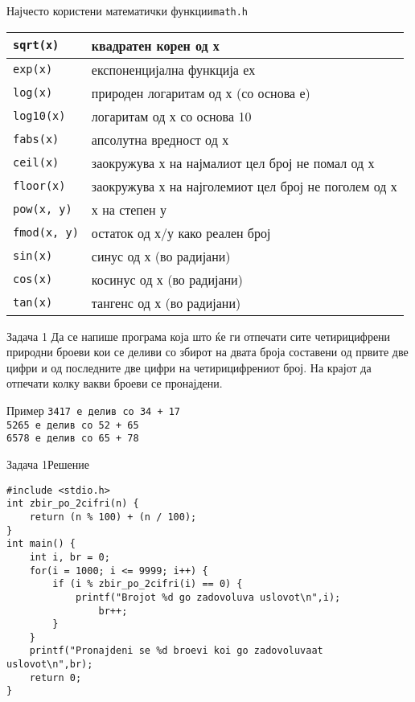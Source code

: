 \begin{frame}{Најчесто користени математички функции}{\texttt{math.h}}
\begin{tabular}{l | l}
\texttt{sqrt(x)} &  квадратен корен од х\\
\hline
\texttt{exp(x)} & експоненцијална функција  ех\\
\hline
\texttt{log(x)} & природен логаритам од х (со основа е)\\
\hline
\texttt{log10(x)} & логаритам од х со основа 10 \\
\hline
\texttt{fabs(x)} & апсолутна вредност од х\\
\hline
\texttt{ceil(x)} & заокружува х на најмалиот цел број не помал од х\\
\hline
\texttt{floor(x)} & заокружува х на најголемиот цел број не поголем од х\\
\hline
\texttt{pow(x, y)}  & х на степен у\\
\hline
\texttt{fmod(x, y)}  & остаток од х/у како реален број\\
\hline
\texttt{sin(x)} & синус од х (во радијани) \\
\hline
\texttt{cos(x)} & косинус од х (во радијани)\\
\hline
\texttt{tan(x)} & тангенс од х (во радијани)
\end{tabular}

\end{frame}

\begin{frame}{Задача 1}
Да се напише програма која што ќе ги отпечати сите четирицифрени природни броеви
кои се деливи со збирот на двата броја составени од првите две цифри и од
последните две цифри на четирицифрениот број. На крајот да отпечати колку вакви
броеви се пронајдени.
\begin{exampleblock}{Пример}
\texttt{3417 е делив со 34 + 17}\\
\texttt{5265 е делив со 52 + 65}\\
\texttt{6578 е делив со 65 + 78}
\end{exampleblock}
\end{frame}

\begin{frame}[fragile]{Задача 1}{Решение}
\begin{lstlisting}
#include <stdio.h>
int zbir_po_2cifri(n) {
    return (n % 100) + (n / 100);
}
int main() {
    int i, br = 0;
    for(i = 1000; i <= 9999; i++) {
        if (i % zbir_po_2cifri(i) == 0) {
            printf("Brojot %d go zadovoluva uslovot\n",i);
                br++;
        }
    }
    printf("Pronajdeni se %d broevi koi go zadovoluvaat uslovot\n",br);
    return 0;
}
\end{lstlisting}
\end{frame}


